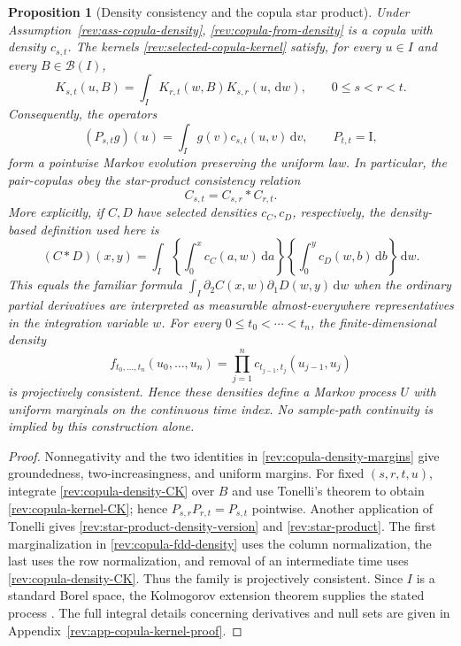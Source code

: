 \documentclass[11pt]{article}
\newtheorem{proposition}[definition]{Proposition}
\theoremstyle{remark}
\newcommand{\dd}{\,\mathrm d}
\begin{document}
\begin{proposition}[Density consistency and the copula star product]
\label{rev:prop-density-copula-consistency}
Under Assumption~\ref{rev:ass-copula-density},
\eqref{rev:copula-from-density} is a copula with density $c_{s,t}$.
The kernels \eqref{rev:selected-copula-kernel} satisfy, for every $u\in I$ and
every $B\in\mathcal B(I)$,
\begin{equation}
K_{s,t}(u,B)=\int_IK_{r,t}(w,B)K_{s,r}(u,\dd w),
\qquad 0\le s<r<t.
\label{rev:copula-kernel-CK}
\end{equation}
Consequently, the operators
\begin{equation}
(P_{s,t}g)(u)=\int_Ig(v)c_{s,t}(u,v)\dd v,
\qquad P_{t,t}=\mathrm I,
\label{rev:copula-density-operator}
\end{equation}
form a pointwise Markov evolution preserving the uniform law.  In particular,
the pair-copulas obey the star-product consistency relation
\begin{equation}
C_{s,t}=C_{s,r}*C_{r,t}.
\label{rev:star-product}
\end{equation}
More explicitly, if $C,D$ have selected densities $c_C,c_D$, respectively,
the density-based definition used here is
\begin{equation}
(C*D)(x,y)
=\int_I
 \left\{\int_0^x c_C(a,w)\dd a\right\}
 \left\{\int_0^y c_D(w,b)\dd b\right\}\dd w.
\label{rev:star-product-density-version}
\end{equation}
This equals the familiar formula
$\int_I\partial_2C(x,w)\partial_1D(w,y)\dd w$ when the ordinary partial
derivatives are interpreted as measurable almost-everywhere representatives in
the integration variable $w$.
For every $0\le t_0<\cdots<t_n$, the finite-dimensional density
\begin{equation}
f_{t_0,\ldots,t_n}(u_0,\ldots,u_n)
=\prod_{j=1}^{n}c_{t_{j-1},t_j}(u_{j-1},u_j)
\label{rev:copula-fdd-density}
\end{equation}
is projectively consistent.  Hence these densities define a Markov process
$U$ with uniform marginals on the continuous time index.  No sample-path
continuity is implied by this construction alone.
\end{proposition}

\begin{proof}
Nonnegativity and the two identities in
\eqref{rev:copula-density-margins} give groundedness, two-increasingness, and
uniform margins.  For fixed $(s,r,t,u)$, integrate
\eqref{rev:copula-density-CK} over $B$ and use Tonelli's theorem to obtain
\eqref{rev:copula-kernel-CK}; hence $P_{s,r}P_{r,t}=P_{s,t}$ pointwise.
Another application of Tonelli gives
\eqref{rev:star-product-density-version} and \eqref{rev:star-product}.
The first marginalization in \eqref{rev:copula-fdd-density} uses the column
normalization, the last uses the row normalization, and removal of an
intermediate time uses \eqref{rev:copula-density-CK}.  Thus the family is
projectively consistent.  Since $I$ is a standard Borel space, the
Kolmogorov extension theorem supplies the stated process
\citep[Chapter~8]{Kallenberg2021}.  The full integral details concerning
derivatives and null sets are given in
Appendix~\ref{rev:app-copula-kernel-proof}.
\end{proof}
\end{document}
